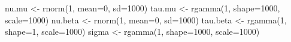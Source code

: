 \documentclass[
]{article}
\newenvironment{Shaded}{\begin{snugshade}}{\end{snugshade}}
\newcommand{\AttributeTok}[1]{\textcolor[rgb]{0.77,0.63,0.00}{#1}}
\newcommand{\DecValTok}[1]{\textcolor[rgb]{0.00,0.00,0.81}{#1}}
\newcommand{\FunctionTok}[1]{\textcolor[rgb]{0.00,0.00,0.00}{#1}}
\newcommand{\NormalTok}[1]{#1}
\newcommand{\OtherTok}[1]{\textcolor[rgb]{0.56,0.35,0.01}{#1}}
\begin{document}
\begin{Shaded}
\begin{Highlighting}[]
\NormalTok{nu.mu }\OtherTok{\textless{}{-}} \FunctionTok{rnorm}\NormalTok{(}\DecValTok{1}\NormalTok{, }\AttributeTok{mean=}\DecValTok{0}\NormalTok{, }\AttributeTok{sd=}\DecValTok{1000}\NormalTok{)}
\NormalTok{tau.mu }\OtherTok{\textless{}{-}} \FunctionTok{rgamma}\NormalTok{(}\DecValTok{1}\NormalTok{, }\AttributeTok{shape=}\DecValTok{1000}\NormalTok{, }\AttributeTok{scale=}\DecValTok{1000}\NormalTok{)}
\NormalTok{nu.beta }\OtherTok{\textless{}{-}} \FunctionTok{rnorm}\NormalTok{(}\DecValTok{1}\NormalTok{, }\AttributeTok{mean=}\DecValTok{0}\NormalTok{, }\AttributeTok{sd=}\DecValTok{1000}\NormalTok{)}
\NormalTok{tau.beta }\OtherTok{\textless{}{-}} \FunctionTok{rgamma}\NormalTok{(}\DecValTok{1}\NormalTok{, }\AttributeTok{shape=}\DecValTok{1}\NormalTok{, }\AttributeTok{scale=}\DecValTok{1000}\NormalTok{)}
\NormalTok{sigma }\OtherTok{\textless{}{-}} \FunctionTok{rgamma}\NormalTok{(}\DecValTok{1}\NormalTok{, }\AttributeTok{shape=}\DecValTok{1000}\NormalTok{, }\AttributeTok{scale=}\DecValTok{1000}\NormalTok{)}


\end{Highlighting}
\end{Shaded}
\end{document}
